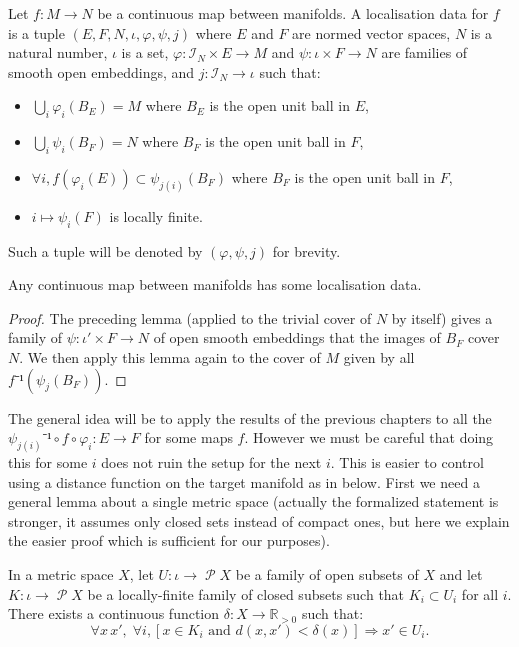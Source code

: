 \documentclass[10pt,a4paper]{article}
\newcounter{chapter}
\DeclareMathOperator{\set}{\mathcal{P}} %
\newcommand{\IT}[1]{\mathcal{I}_{#1}}
\newcommand{\uses}[1]{}
\newcommand{\lean}[1]{}
\newcommand{\leanok}{}
\begin{document}
\begin{definition}
  \label{def:localisation_data}
  \uses{def:index_type}
  \lean{LocalisationData}
  \leanok
  Let $f : M → N$ be a continuous map between manifolds. A localisation data
  for $f$ is a tuple $(E, F, N, ι, φ, ψ, j)$ where $E$ and $F$ are normed
  vector spaces, $N$ is a natural number, $ι$ is a set, $φ : \IT{N} × E → M$
  and $ψ : ι × F → N$  are families of smooth open embeddings, and
  $j : \IT{N} → ι$ such that:
  \begin{itemize}
    \item
      $⋃_i φ_i(B_E) = M$ where $B_E$ is the open unit ball in $E$,
      \item
      $⋃_i ψ_i(B_F) = N$ where $B_F$ is the open unit ball in $F$,
    \item
      $∀ i, f(φ_i(E)) ⊂ ψ_{j(i)}(B_F)$ where $B_F$ is the open unit ball in $F$,
    \item
      $i \mapsto ψ_i(F)$ is locally finite.
  \end{itemize}
  Such a tuple will be denoted by $(φ, ψ, j)$ for brevity.
\end{definition}

\begin{lemma}
  \label{lem:ex_localisation}
  \uses{def:localisation_data}
  \lean{stdLocalisationData}
  \leanok
  Any continuous map between manifolds has some localisation data.
\end{lemma}

\begin{proof}
  \uses{lem:nice_atlas}
  \leanok
  The preceding lemma (applied to the trivial cover of $N$ by itself) gives a
  family of $ψ : ι' × F → N$ of open smooth embeddings that the images of
  $B_F$ cover $N$. We then apply this lemma again to the cover of $M$ given by all
  $f⁻¹(ψ_j(B_F))$.
\end{proof}

The general idea will be to apply the results of the previous chapters to
all the $ψ_{j(i)}⁻¹ ∘ f ∘ φ_i : E → F$ for some maps $f$. However we must be
careful that doing this for some $i$ does not ruin the setup for the next $i$.
This is easier to control using a distance function on the target manifold as
in  below. First we need a general lemma about
a single metric space (actually the formalized statement is stronger, it assumes
only closed sets instead of compact ones, but here we explain the easier proof
which is sufficient for our purposes).

\begin{lemma}
  \label{lem:stability_cover}
  \lean{Metric.exists_continuous_real_forall_closedBall_subset}
  \leanok
  In a metric space $X$, let $U : ι → \set{X}$ be a
  family of open subsets of $X$ and let $K : ι → \set{X}$ be a locally-finite
  family of closed subsets such that $K_i ⊂ U_i$ for all $i$. There exists a continuous
  function $δ : X → ℝ_{> 0}$ such that:
  \[
    ∀ x\, x',\; ∀ i, \left[x ∈ K_i \text{ and } d(x, x') < δ(x)\right] ⇒ x' ∈ U_i.
  \]
\end{lemma}
\end{document}
